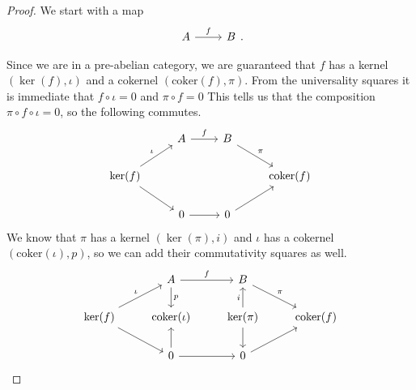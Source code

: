 \documentclass[a4paper,10pt]{scrreprt}
\newcommand{\coker}{\mathrm{coker}}
\theoremstyle{definition}
\theoremstyle{plain}
\theoremstyle{remark}
\begin{document}
\begin{proof}
  We start with a map
  \begin{equation*}
    \begin{tikzcd}
      A 
      \arrow[r, "f"]
      & B
    \end{tikzcd}.
  \end{equation*}

  Since we are in a pre-abelian category, we are guaranteed that $f$ has a kernel $(\ker(f), \iota)$ and a cokernel $(\coker(f), \pi)$. From the universality squares it is immediate that $f \circ \iota = 0$ and $\pi \circ f = 0$ This tells us that the composition $\pi \circ f \circ \iota = 0$, so the following commutes.
  \begin{equation*}
    \begin{tikzcd}
      & A
      \arrow[r, "f"]
      & B
      \arrow[dr, "\pi"]
      \\
      \ker(f)
      \arrow[ur, "\iota"]
      \arrow[dr]
      & & & \coker(f)
      \\
      & 0
      \arrow[r]
      & 0
      \arrow[ur]
    \end{tikzcd}
  \end{equation*}
  We know that $\pi$ has a kernel $(\ker(\pi), i)$ and $\iota$ has a cokernel $(\coker(\iota), p)$, so we can add their commutativity squares as well.
  \begin{equation*}
    \begin{tikzcd}
      & A
      \arrow[r, "f"]
      \arrow[d, "p"]
      & B
      \arrow[dr, "\pi"]
      \\
      \ker(f)
      \arrow[ur, "\iota"]
      \arrow[dr]
      & \coker(\iota)
      & \ker(\pi)
      \arrow[u, "i"]
      \arrow[d]
      & \coker(f)
      \\
      & 0
      \arrow[u]
      \arrow[r]
      & 0
      \arrow[ur]
    \end{tikzcd}
  \end{equation*}


\end{proof}
\end{document}
